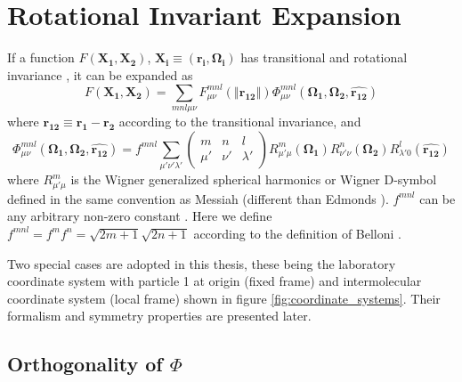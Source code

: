 
\chapter{Rotational Invariant Expansion\label{chpt:rotational-invariant-expansion}}

If a function $F(\mathbf{X_{1}},\mathbf{X_{2}})$, $\mathbf{X_{i}}\equiv(\mathbf{r_{i}},\mathbf{\Omega_{i}})$
has transitional and rotational invariance \citep{Blum_I}, it can
be expanded as
\begin{equation}
F(\mathbf{X_{1}},\mathbf{X_{2}})=\sum_{mnl\mu\nu}F_{\mu\nu}^{mnl}(\left\Vert \mathbf{r_{12}}\right\Vert )\Phi_{\mu\nu}^{mnl}(\mathbf{\Omega_{1}},\mathbf{\Omega_{2}},\mathbf{\hat{r_{12}}})\label{eq:pdf_on_rot_invar}
\end{equation}
where $\mathbf{r_{12}}\equiv\mathbf{r_{1}}-\mathbf{r_{2}}$ according
to the transitional invariance, and
\begin{equation}
\Phi_{\mu\nu}^{mnl}(\mathbf{\Omega_{1}},\mathbf{\Omega_{2}},\mathbf{\hat{r_{12}}})=f^{mnl}\sum_{\mu'\nu'\lambda'}\left(\begin{array}{ccc}
m & n & l\\
\mu' & \nu' & \lambda'
\end{array}\right)R_{\mu'\mu}^{m}(\mathbf{\Omega_{1}})R_{\nu'\nu}^{n}(\mathbf{\Omega_{2}})R_{\lambda'0}^{l}(\mathbf{\hat{r_{12}}})\label{eq:definition_rot_invar}
\end{equation}
where $R_{\mu'\mu}^{m}$ is the Wigner generalized spherical harmonics
or Wigner D-symbol defined in the same convention as Messiah \citep{Messiah}
(different than Edmonds \citep{Edmonds}). $f^{mnl}$ can be any arbitrary
non-zero constant \citep{Fries_Patey_1985}. Here we define $f^{mnl}=f^{m}f^{n}=\sqrt{2m+1}\sqrt{2n+1}$
according to the definition of Belloni \citep{Luc_2014}.

Two special cases are adopted in this thesis, these being the laboratory
coordinate system with particle 1 at origin (fixed frame) and intermolecular
coordinate system (local frame) shown in figure \ref{fig:coordinate_systems}.
Their formalism and symmetry properties are presented later.


\section{Orthogonality of $\Phi$}

